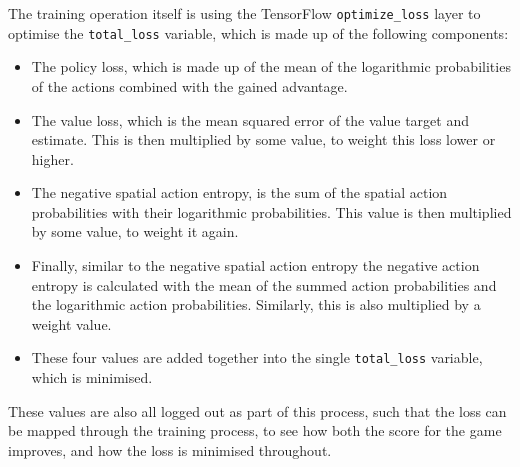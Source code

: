 The training operation itself is using the TensorFlow \texttt{optimize\_loss}
layer to optimise the \texttt{total\_loss} variable, which is made up of the
following components:

\begin{itemize}
    \item The policy loss, which is made up of the mean of the logarithmic
        probabilities of the actions combined with the gained advantage.
    \item The value loss, which is the mean squared error of the value target
        and estimate. This is then multiplied by some value, to weight this loss
        lower or higher.
    \item The negative spatial action entropy, is the sum of the spatial action
        probabilities with their logarithmic probabilities. This value is then
        multiplied by some value, to weight it again.
    \item Finally, similar to the negative spatial action entropy the negative
        action entropy is calculated with the mean of the summed action
        probabilities and the logarithmic action probabilities. Similarly, this
        is also multiplied by a weight value.
    \item These four values are added together into the single
        \texttt{total\_loss} variable, which is minimised.
\end{itemize}

These values are also all logged out as part of this process, such that the loss
can be mapped through the training process, to see how both the score for the
game improves, and how the loss is minimised throughout.
